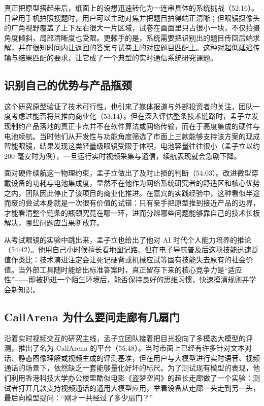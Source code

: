 \documentclass[UTF8,a4paper,11pt,fontset=fandol]{ctexart}
\begin{document}
真正把原型搭起来后，纸面上的设想迅速转化为一连串具体的系统挑战（52:16）。日常用手机拍照搜题时，用户可以主动对焦并把题目拍得端正清晰；但眼镜摄像头的广角视野覆盖了上下左右很大一片区域，试卷在画面里只占很小一块，不仅拍摄角度倾斜，局部清晰度也受限。更棘手的是，系统需要把识别出的题目传回后端求解，并在很短时间内让返回的答案与试卷上的对应题目匹配上。这种对超低延迟传输与结果匹配的要求，让它成了一个典型的实时通信系统研究课题。

\subsection{识别自己的优势与产品瓶颈}
这个研究原型验证了技术可行性，也引来了媒体报道与外部投资者的关注，团队一度考虑过能否将其推向商业化（53:14）。但在深入评估整条技术链路时，孟子立发现制约产品落地的真正卡点并不在软件算法或网络传输，而在于高度集成的硬件与电池续航。当时他们从开发性与功能角度筛选了市面上三款能够支持该方案的现成智能眼镜，结果发现这类轻量级眼镜受限于体积，电池容量往往很小（孟子立以约 200 毫安时为例），一旦运行实时视频采集与通信，续航表现就会急剧下降。

面对硬件续航这一物理约束，孟子立做出了及时止损的判断（54:03）。改进微型穿戴设备的功耗与电池集成度，显然不在他作为网络系统研究者的舒适区和核心优势之内，团队因此停止了该项目的商业化推进。在嘉宾的实践经验中，这种看似半途而废的尝试本身就是一次很有价值的试错：只有亲手把原型推到接近产品的边界，才能看清整个链条的瓶颈究竟在哪一环，进而分辨哪些问题能够靠自己的技术长板解决，哪些问题应当果断放弃。

从考试眼镜的实验中跳出来，孟子立也给出了他对 AI 时代个人能力培养的推论（54:42）。他用自己小时候擅长看地图记路、但在电子导航普及后这项技能迅速贬值作类比：技术演进注定会让死记硬背或机械应试等固有技能失去原有的社会价值。当外部工具随时能给出标准答案时，真正留存下来的核心竞争力是“适应性”——即被扔进一个陌生环境后，能否保持良好的思维习惯，快速摸清规则并学会新知识。

\subsection{CallArena 为什么要问走廊有几扇门}
沿着实时视频交互的研究主线，孟子立团队接着把目光投向了多模态大模型的评测，推出了名为 CallArena 的平台（55:48）。当时市面上已经有许多针对文本对话、静态图像理解或视频生成的评测基准，但在用户与大模型进行实时语音、视频通话的场景下，依然缺乏一套能够量化好坏的标尺。为了测试现有模型的表现，他们利用香港科技大学办公楼里酷似电影《盗梦空间》的超长走廊做了一个实验：测试者打开几款支持视频通话的通用大模型应用，举着设备从走廊一头走到另一头，最后向模型提问：“刚才一共经过了多少扇门？”
\end{document}
